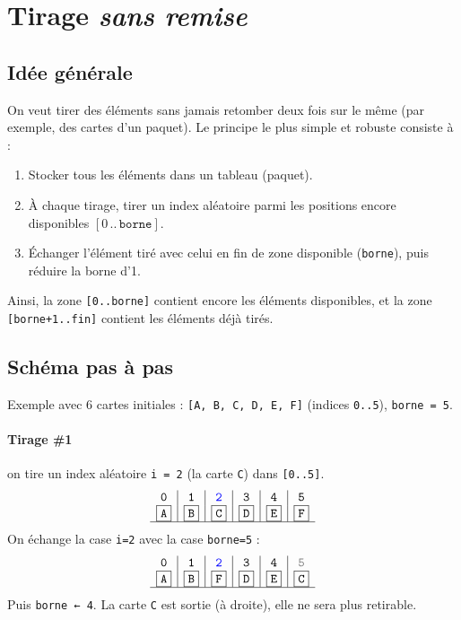 \section{Tirage \emph{sans remise}}
\label{sec:tirage-sans-remise}

\subsection{Idée générale}
On veut tirer des éléments sans jamais retomber deux fois sur le même
(par exemple, des cartes d'un paquet). Le principe le plus simple et
robuste consiste à :
\begin{enumerate}
  \item Stocker tous les éléments dans un tableau (paquet).
  \item À chaque tirage, tirer un index aléatoire parmi les positions encore disponibles $[0\,..\,\texttt{borne}]$.
  \item Échanger l'élément tiré avec celui en fin de zone disponible (\texttt{borne}), puis réduire la borne d'1.
\end{enumerate}
Ainsi, la zone \texttt{[0..borne]} contient encore les éléments
disponibles, et la zone \texttt{[borne+1..fin]} contient les éléments
déjà tirés.

\subsection{Schéma pas à pas}
Exemple avec 6 cartes initiales : \texttt{[A, B, C, D, E, F]} (indices \texttt{0..5}), \texttt{borne = 5}.

\paragraph{Tirage \#1} on tire un index aléatoire \texttt{i = 2} (la carte \texttt{C}) dans \texttt{[0..5]}.
\[
\begin{array}{c|c|c|c|c|c}
\texttt{0} & \texttt{1} & \color{blue}{\texttt{2}} & \texttt{3} & \texttt{4} & \texttt{5}\\
\boxed{\texttt{A}} & \boxed{\texttt{B}} & \boxed{\texttt{C}} & \boxed{\texttt{D}} & \boxed{\texttt{E}} & \boxed{\texttt{F}} \\
\hline
\end{array}
\]
On échange la case \texttt{i=2} avec la case \texttt{borne=5} :
\[
\begin{array}{c|c|c|c|c|c}
\texttt{0} & \texttt{1} & \color{blue}{\texttt{2}} & \texttt{3} & \texttt{4} & \color{gray}{\texttt{5}}\\
\boxed{\texttt{A}} & \boxed{\texttt{B}} & \boxed{\texttt{F}} & \boxed{\texttt{D}} & \boxed{\texttt{E}} & \fbox{\texttt{C}} \\
\hline
\end{array}
\]
Puis \texttt{borne ← 4}. La carte \texttt{C} est sortie (à droite), elle ne sera plus retirable.

